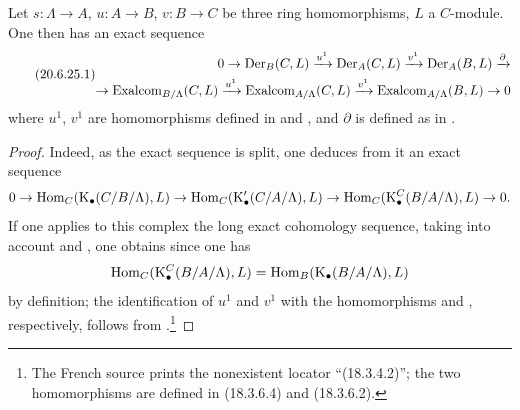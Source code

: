 \begin{proposition}[20.6.25]
\label{0.20.6.25}
Let $s:\Lambda\to A$, $u:A\to B$, $v:B\to C$ be three ring homomorphisms, $L$ a $C$-module.
One then has an exact sequence
\begin{equation}
\tag{20.6.25.1}
  \label{0.20.6.25.1}
\begin{split}
  0\to\operatorname{Der}_B(C,L)\xrightarrow{u^1}\operatorname{Der}_A(C,L)\xrightarrow{v^1}\operatorname{Der}_A(B,L)\xrightarrow{\partial} \\
  \to\operatorname{Exalcom}_{B/\Lambda}(C,L)\xrightarrow{u^1}\operatorname{Exalcom}_{A/\Lambda}(C,L)\xrightarrow{v^1}\operatorname{Exalcom}_{A/\Lambda}(B,L)\to 0
\end{split}
\end{equation}
where $u^1$, $v^1$ are homomorphisms defined in  and , and $\partial$ is defined as in .
\end{proposition}

\begin{proof}
Indeed, as the exact sequence  is split, one deduces from it an exact sequence
\[
  0\to\operatorname{Hom}_C(\mathrm{K}_\bullet(C/B/\Lambda),L)\to\operatorname{Hom}_C(\mathrm{K}'_\bullet(C/A/\Lambda),L)\to\operatorname{Hom}_C(\mathrm{K}^C_\bullet(B/A/\Lambda),L)\to 0.
\]
If one applies to this complex the long exact cohomology sequence, taking into account  and , one obtains  since one has
\[
  \operatorname{Hom}_C(\mathrm{K}^C_\bullet(B/A/\Lambda),L)=\operatorname{Hom}_B(\mathrm{K}_\bullet(B/A/\Lambda),L)
\]
by definition; the identification of $u^1$ and $v^1$ with the homomorphisms  and , respectively, follows from .\footnote{The French source prints the nonexistent locator ``(18.3.4.2)''; the two homomorphisms are defined in (18.3.6.4) and (18.3.6.2).}
\end{proof}

